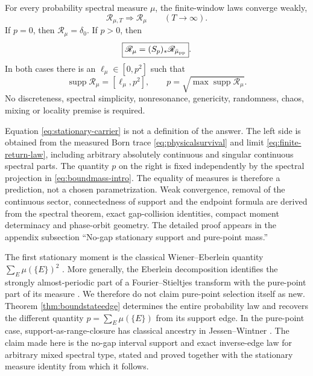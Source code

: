 \begin{theorem}
\label{thm:boundstateedge}
For every probability spectral measure $\mu$, the finite-window laws converge
weakly,
\begin{equation}
 \mathscr R_{\mu,T}\Longrightarrow\mathscr R_\mu
 \qquad(T\to\infty).                                 \label{eq:stationary-weak}
\end{equation}
If $p=0$, then $\mathscr R_\mu=\delta_0$.  If $p>0$, then
\begin{equation}
 \boxed{\mathscr R_\mu=(S_p)_*\mathscr R_{\bar\mu_{\rm pp}}}.  \label{eq:stationary-carrier}
\end{equation}
In both cases there is an $\ell_\mu\in[0,p^2]$ such that
\begin{equation}
 \boxed{\operatorname{supp}\mathscr R_\mu=[\ell_\mu,p^2]},
 \qquad
 \boxed{p=\sqrt{\max\operatorname{supp}\mathscr R_\mu}}.       \label{eq:boundstateedge}
\end{equation}
No discreteness, spectral simplicity, nonresonance, genericity, randomness,
chaos, mixing or locality premise is required.
\end{theorem}

Equation \eqref{eq:stationary-carrier} is not a definition of the answer.
The left side is obtained from the measured Born trace
\eqref{eq:physicalsurvival} and limit \eqref{eq:finite-return-law}, including
arbitrary absolutely continuous and singular continuous spectral parts.  The
quantity $p$ on the right is fixed independently by the spectral projection
in \eqref{eq:boundmass-intro}.  The equality of measures is therefore a
prediction, not a chosen parametrization.  Weak convergence, removal of the
continuous sector, connectedness of support and the endpoint formula are
derived from the spectral theorem, exact gap-collision identities, compact
moment determinacy and phase-orbit geometry.  The detailed proof appears in
the appendix subsection ``No-gap stationary support and pure-point mass.''

The first stationary moment is the classical Wiener--Eberlein quantity
$\sum_E\mu(\{E\})^2$ \cite{Eberlein1955}.  More generally, the Eberlein
decomposition identifies the strongly almost-periodic part of a
Fourier--Stieltjes transform with the pure-point part of its measure
\cite{StrungaruTerauds2016}.  We therefore do not claim pure-point selection
itself as new.  Theorem
\ref{thm:boundstateedge} determines the entire probability law and recovers
the different quantity $p=\sum_E\mu(\{E\})$ from its support edge.  In the
pure-point case, support-as-range-closure has classical ancestry in
Jessen--Wintner \cite{JessenWintner1935}.  The claim made here is the
no-gap interval support and exact inverse-edge law for arbitrary mixed
spectral type, stated and proved together with the stationary measure
identity from which it follows.

